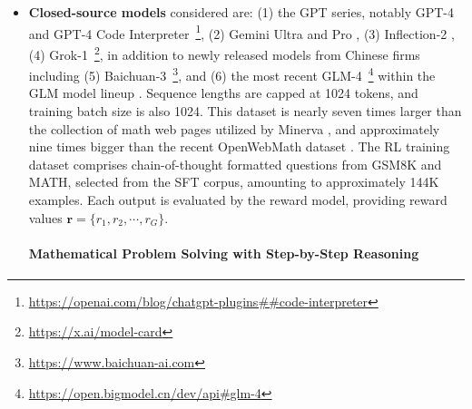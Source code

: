 \begin{itemize}[topsep=0pt]
\begin{itemize}[topsep=0pt]
\begin{itemize}[topsep=0pt]
\begin{itemize}[topsep=0pt]
    \item \textbf{Closed-source models} considered are: (1) the GPT series, notably GPT-4 \citep{gpt4} and GPT-4 Code Interpreter~\footnote{\url{https://openai.com/blog/chatgpt-plugins\#\#code-interpreter}}, (2) Gemini Ultra and Pro \citep{gemini}, (3) Inflection-2 \citep{inflection-2}, (4) Grok-1~\footnote{\url{https://x.ai/model-card}}, in addition to newly released models from Chinese firms including (5) Baichuan-3~\footnote{\url{https://www.baichuan-ai.com}}, and (6) the most recent GLM-4~\footnote{\url{https://open.bigmodel.cn/dev/api\#glm-4}} within the GLM model lineup \citep{glm}. Sequence lengths are capped at 1024 tokens, and training batch size is also 1024. This dataset is nearly seven times larger than the collection of math web pages utilized by Minerva \citep{minerva}, and approximately nine times bigger than the recent OpenWebMath dataset \citep{openwebmath}. The RL training dataset comprises chain-of-thought formatted questions from GSM8K and MATH, selected from the SFT corpus, amounting to approximately 144K examples. Each output is evaluated by the reward model, providing reward values $\mathbf{r}=\{r_1, r_2, \cdots, r_G\}$. \paragraph{Mathematical Problem Solving with Step-by-Step Reasoning}


\end{itemize}
\end{itemize}
\end{itemize}
\end{itemize}
